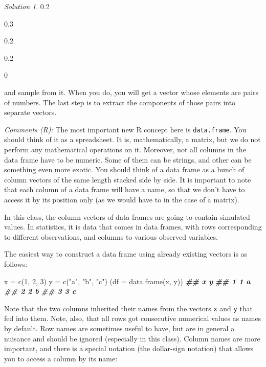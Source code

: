 \documentclass[
]{book}
\newenvironment{Shaded}{\begin{snugshade}}{\end{snugshade}}
\newcommand{\AttributeTok}[1]{\textcolor[rgb]{0.77,0.63,0.00}{#1}}
\newcommand{\DecValTok}[1]{\textcolor[rgb]{0.00,0.00,0.81}{#1}}
\newcommand{\DocumentationTok}[1]{\textcolor[rgb]{0.56,0.35,0.01}{\textbf{\textit{#1}}}}
\newcommand{\FunctionTok}[1]{\textcolor[rgb]{0.00,0.00,0.00}{#1}}
\newcommand{\NormalTok}[1]{#1}
\newcommand{\OtherTok}[1]{\textcolor[rgb]{0.56,0.35,0.01}{#1}}
\newcommand{\StringTok}[1]{\textcolor[rgb]{0.31,0.60,0.02}{#1}}
\theoremstyle{definition}
\theoremstyle{definition}
\theoremstyle{definition}
\theoremstyle{definition}
\theoremstyle{remark}
\newtheorem*{solution}{Solution}
\begin{document}
\begin{solution}
0.2

0.3

0.2

0.2

0

and sample from it. When you do, you will get a vector whose elements are pairs
of numbers. The last step is to extract the components of those pairs into
separate vectors.

\emph{Comments (R):} The most important new R concept here is \texttt{data.frame}. You should think of
it as a spreadsheet. It is, mathematically, a matrix, but we do not perform any
mathematical operations on it. Moreover, not all columns in the data frame have
to be numeric. Some of them can be strings, and other can be something even more
exotic. You should think of a data frame as a bunch of column vectors of the
same length stacked side by side. It is important to note that each column of a
data frame will have a name, so that we don't have to access it by its position
only (as we would have to in the case of a matrix).

In this class, the column vectors of data frames are going to contain simulated
values. In statistics, it is data that comes in data frames, with rows
corresponding to different observations, and columns to various observed
variables.

The easiest way to construct a data frame using already existing vectors is as follows:

\begin{Shaded}
\begin{Highlighting}[]
\NormalTok{x }\OtherTok{=} \FunctionTok{c}\NormalTok{(}\DecValTok{1}\NormalTok{, }\DecValTok{2}\NormalTok{, }\DecValTok{3}\NormalTok{)}
\NormalTok{y }\OtherTok{=} \FunctionTok{c}\NormalTok{(}\StringTok{"a"}\NormalTok{, }\StringTok{"b"}\NormalTok{, }\StringTok{"c"}\NormalTok{)}
\NormalTok{(}\AttributeTok{df =} \FunctionTok{data.frame}\NormalTok{(x, y))}
\DocumentationTok{\#\#   x y}
\DocumentationTok{\#\# 1 1 a}
\DocumentationTok{\#\# 2 2 b}
\DocumentationTok{\#\# 3 3 c}
\end{Highlighting}
\end{Shaded}

Note that the two columns inherited their names from the vectors \texttt{x} and \texttt{y}
that fed into them. Note, also, that all rows got consecutive numerical values
as names by default. Row names are sometimes useful to have, but are in general
a nuisance and should be ignored (especially in this class). Column names are
more important, and there is a special notation (the dollar-sign notation) that
allows you to access a column by its name:


\end{solution}
\end{document}
